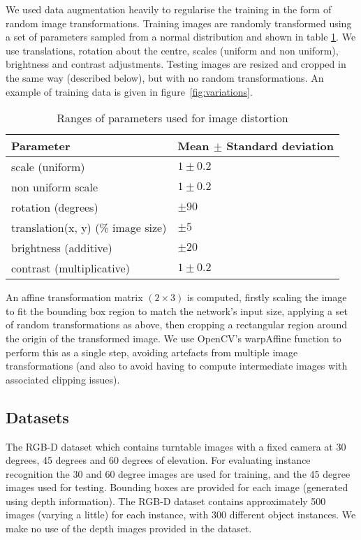 \documentclass[conference]{IEEEtran}
\begin{document}
We used data augmentation heavily to regularise the training in the form of random image transformations. Training images are randomly transformed using a set of parameters sampled from a normal distribution and shown in table \ref{fig:jitter}.  We use translations, rotation about the centre, scales (uniform and non uniform), brightness and contrast adjustments. Testing images are resized and cropped in the same way (described below), but with no random transformations. An example of training data is given in figure~\ref{fig:variations}.

\begin{table}[h]
  \centering
    \caption{Ranges of parameters used for image distortion }
    
  \begin{tabular}{ l  l }
    Parameter & Mean $ \pm $ Standard deviation \\
    \toprule
    scale (uniform) & $ 1 \pm 0.2 $  \\ 
    non uniform scale  & $ 1 \pm 0.2 $  \\ 
    rotation (degrees) & $ \pm 90 $ \\ 
    translation(x, y) (\% image size) & $ \pm 5 $ \\ 
    brightness (additive) & $ \pm 20 $ \\ 
    contrast (multiplicative) & $ 1 \pm 0.2 $ \\ 
    \bottomrule
  \end{tabular}
\label{fig:jitter}
\end{table}


An affine transformation matrix $ (2 \times 3) $ is computed, firstly scaling the image to fit the bounding box region to match the network's input size, applying a set of random transformations as above, then cropping a rectangular region around the origin of the transformed image. We use OpenCV's warpAffine function to perform this as a single step, avoiding artefacts from multiple image transformations (and also to avoid having to compute intermediate images with associated clipping issues).

\subsection{Datasets}

The RGB-D \cite{Lai2011} dataset which contains turntable images with a fixed camera at 30 degrees, 45 degrees and 60 degrees of elevation. For evaluating instance recognition the 30 and 60 degree images are used for training, and the 45 degree images used for testing. Bounding boxes are provided for each image (generated using depth information). The RGB-D dataset contains approximately 500 images (varying a little) for each instance, with 300 different object instances. We make no use of the depth images provided in the dataset.
\end{document}
